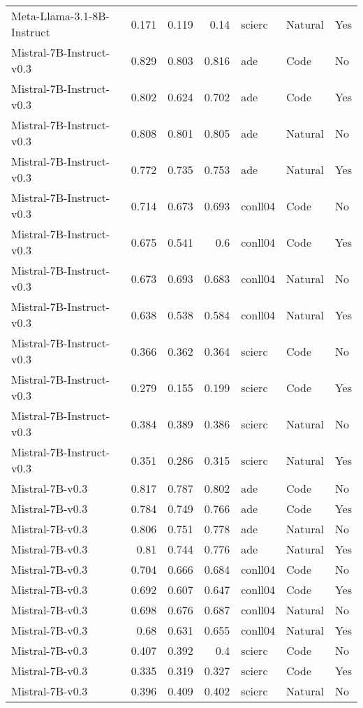 \begin{tabular}{lrrrlll}
Meta-Llama-3.1-8B-Instruct & 0.171 & 0.119 & 0.14 & scierc & Natural & Yes \\
Mistral-7B-Instruct-v0.3 & 0.829 & 0.803 & 0.816 & ade & Code & No \\
Mistral-7B-Instruct-v0.3 & 0.802 & 0.624 & 0.702 & ade & Code & Yes \\
Mistral-7B-Instruct-v0.3 & 0.808 & 0.801 & 0.805 & ade & Natural & No \\
Mistral-7B-Instruct-v0.3 & 0.772 & 0.735 & 0.753 & ade & Natural & Yes \\
Mistral-7B-Instruct-v0.3 & 0.714 & 0.673 & 0.693 & conll04 & Code & No \\
Mistral-7B-Instruct-v0.3 & 0.675 & 0.541 & 0.6 & conll04 & Code & Yes \\
Mistral-7B-Instruct-v0.3 & 0.673 & 0.693 & 0.683 & conll04 & Natural & No \\
Mistral-7B-Instruct-v0.3 & 0.638 & 0.538 & 0.584 & conll04 & Natural & Yes \\
Mistral-7B-Instruct-v0.3 & 0.366 & 0.362 & 0.364 & scierc & Code & No \\
Mistral-7B-Instruct-v0.3 & 0.279 & 0.155 & 0.199 & scierc & Code & Yes \\
Mistral-7B-Instruct-v0.3 & 0.384 & 0.389 & 0.386 & scierc & Natural & No \\
Mistral-7B-Instruct-v0.3 & 0.351 & 0.286 & 0.315 & scierc & Natural & Yes \\
Mistral-7B-v0.3 & 0.817 & 0.787 & 0.802 & ade & Code & No \\
Mistral-7B-v0.3 & 0.784 & 0.749 & 0.766 & ade & Code & Yes \\
Mistral-7B-v0.3 & 0.806 & 0.751 & 0.778 & ade & Natural & No \\
Mistral-7B-v0.3 & 0.81 & 0.744 & 0.776 & ade & Natural & Yes \\
Mistral-7B-v0.3 & 0.704 & 0.666 & 0.684 & conll04 & Code & No \\
Mistral-7B-v0.3 & 0.692 & 0.607 & 0.647 & conll04 & Code & Yes \\
Mistral-7B-v0.3 & 0.698 & 0.676 & 0.687 & conll04 & Natural & No \\
Mistral-7B-v0.3 & 0.68 & 0.631 & 0.655 & conll04 & Natural & Yes \\
Mistral-7B-v0.3 & 0.407 & 0.392 & 0.4 & scierc & Code & No \\
Mistral-7B-v0.3 & 0.335 & 0.319 & 0.327 & scierc & Code & Yes \\
Mistral-7B-v0.3 & 0.396 & 0.409 & 0.402 & scierc & Natural & No \\

\end{tabular}
